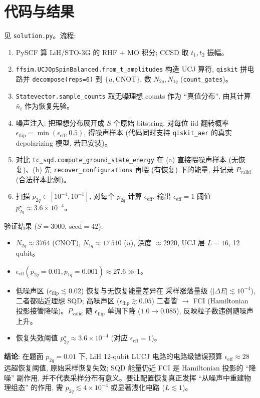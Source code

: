 \documentclass[11pt]{article}
\begin{document}
\section*{代码与结果}
见 \texttt{solution.py}。流程:
\begin{enumerate}
  \item PySCF 算 LiH/STO-3G 的 RHF + MO 积分; CCSD 取 $t_1,t_2$ 振幅。
  \item \texttt{ffsim.UCJOpSpinBalanced.from\_t\_amplitudes} 构造 UCJ 算符,
        \texttt{qiskit} 拼电路并 \texttt{decompose(reps=6)} 到 $\{u,\text{CNOT}\}$,
        数 $N_{2q},N_{1q}$ (\texttt{count\_gates})。
  \item \texttt{Statevector.sample\_counts} 取无噪理想 counts 作为 ``真值分布'',
        由其计算 $\bar n_i$ 作为恢复先验。
  \item 噪声注入: 把理想分布展开成 $S$ 个原始 bitstring, 对每位 iid 翻转概率
        $\epsilon_{\text{flip}}=\min(\epsilon_{\text{eff}},0.5)$, 得噪声样本
        (代码同时支持 \texttt{qiskit\_aer} 的真实 depolarizing 模型, 若已安装)。
  \item 对比 \texttt{tc\_sqd.compute\_ground\_state\_energy} 在
        (a) 直接喂噪声样本 (无恢复)、(b) 先 \texttt{recover\_configurations} 再喂
        (有恢复) 下的能量, 并记录 $P_{\text{valid}}$ (合法样本比例)。
  \item 扫描 $p_{2q}\in[10^{-4},10^{-1}]$, 对每个 $p_{2q}$ 计算
        $\epsilon_{\text{eff}}$, 输出 $\epsilon_{\text{eff}}=1$ 阈值
        $p_{2q}^{\star}\approx3.6{\times}10^{-4}$。
\end{enumerate}
验证结果 ($S{=}3000$, seed$=$42):
\begin{itemize}
  \item $N_{2q}\approx3764$ (CNOT), $N_{1q}\approx17\,510$ ($u$), 深度 $\approx2920$,
        UCJ 层 $L=16$, 12 qubit。
  \item $\epsilon_{\text{eff}}(p_{2q}{=}0.01,p_{1q}{=}0.001)\approx 27.6\gg1$。
  \item 低噪声区 ($\epsilon_{\text{flip}}\lesssim0.02$) 恢复与无恢复能量差异在
        采样涨落量级 ($|\Delta E|\lesssim 10^{-4}$), 二者都贴近理想 SQD;
        高噪声区 ($\epsilon_{\text{flip}}\gtrsim0.05$) 二者皆 $\to$ FCI
        (Hamiltonian 投影接管降噪)。$P_{\text{valid}}$ 随 $\epsilon_{\text{flip}}$
        单调下降 ($1.0\to0.085$), 反映粒子数违例随噪声上升。
  \item 恢复失效阈值 $p_{2q}^{\star}\approx3.6{\times}10^{-4}$ (对应 $\epsilon_{\text{eff}}=1$)。
\end{itemize}
\textbf{结论}: 在题面 $p_{2q}{=}0.01$ 下, LiH 12-qubit LUCJ 电路的电路级错误预算
$\epsilon_{\text{eff}}\approx28$ 远超恢复阈值, 原始采样恢复失效; SQD 能量仍近 FCI 是
Hamiltonian 投影的 ``降噪'' 副作用, 并不代表采样分布有意义。要让配置恢复真正发挥
``从噪声中重建物理组态'' 的作用, 需 $p_{2q}\lesssim4{\times}10^{-4}$ 或显著浅化电路
($L\lesssim1$)。
\end{document}

